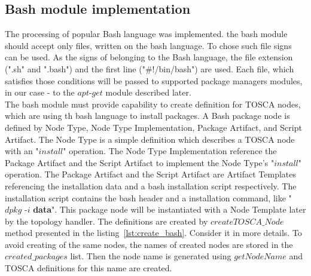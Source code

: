 \subsection*{Bash module implementation}
The processing of popular Bash language was implemented. 
the bash module should accept only files, written on the bash language.
To chose such file signs can be used. 
As the signs of belonging to the Bash language, the file extension (".sh" and ".bash") and the first line ("\#!/bin/bash") are used. 
Each file, which satisfies those conditions will be passed to supported package managers modules, in our case - to the $apt$-$get$ module described later. \\
The bash module must provide capability to create definition for TOSCA nodes, which are using th bash language to install packages.
A Bash package node is defined by Node Type, Node Type Implementation, Package Artifact, and Script Artifact.
The Node Type is a simple definition which describes a TOSCA node with an "$install$" operation.
The Node Type Implementation reference the  Package Artifact and the Script Artifact to implement the Node Type's "$install$" operation.
The Package Artifact and the Script Artifact are Artifact Templates referencing the installation data and a bash installation script respectively.
The installation script contains the bash header and a installation command, like "$dpkg$ -$i$ \textbf{data}".
This package node will be instantiated with a Node Template later by the topology handler.
The definitions are created by $createTOSCA\_Node$ method presented in the listing~\ref{lst:create_bash}.
Consider it in more details.
To avoid creating of the same nodes, the names of created nodes are stored in the $created\_packages$ list.
Then the node name is generated using $getNodeName$ and TOSCA definitions for this name are created.

